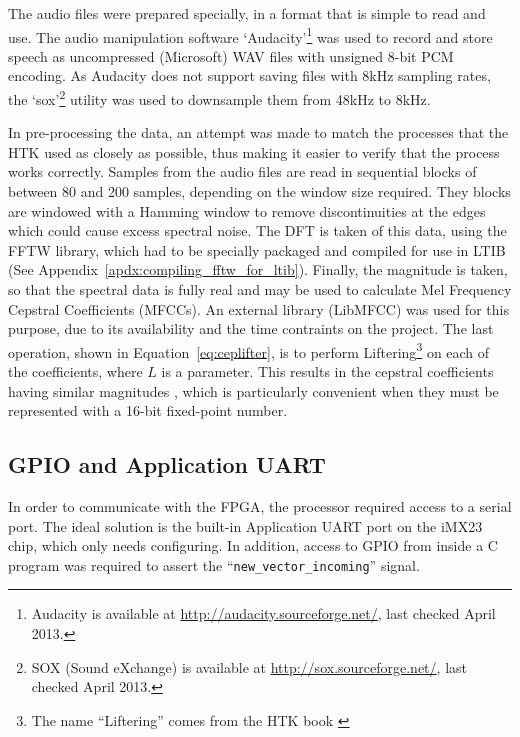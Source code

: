 		The audio files were prepared specially, in a format that is simple to read and use.  The audio manipulation software `Audacity'\footnote{Audacity is available at \href{http://audacity.sourceforge.net/}{http://audacity.sourceforge.net/}, last checked April 2013.} was used to record and store speech as uncompressed (Microsoft) WAV files with unsigned 8-bit PCM encoding.  As Audacity does not support saving files with 8kHz sampling rates, the `sox'\footnote{SOX (Sound eXchange) is available at \href{http://sox.sourceforge.net/}{http://sox.sourceforge.net/}, last checked April 2013.} utility was used to downsample them from 48kHz to 8kHz.

		In pre-processing the data, an attempt was made to match the processes that the HTK used as closely as possible, thus making it easier to verify that the process works correctly.  Samples from the audio files are read in sequential blocks of between 80 and 200 samples, depending on the window size required.  They blocks are windowed with a Hamming window to remove discontinuities at the edges which could cause excess spectral noise.  The DFT is taken of this data, using the FFTW library, which had to be specially packaged and compiled for use in LTIB (See Appendix~\ref{apdx:compiling_fftw_for_ltib}).  Finally, the magnitude is taken, so that the spectral data is fully real and may be used to calculate Mel Frequency Cepstral Coefficients (MFCCs).  An external library (LibMFCC) was used for this purpose, due to its availability and the time contraints on the project.  The last operation, shown in Equation~\ref{eq:ceplifter}, is to perform Liftering\footnote{The name ``Liftering'' comes from the HTK book \cite{htkbook}} on each of the coefficients, where $L$ is a parameter.  This results in the cepstral coefficients having similar magnitudes \cite{htkbook}, which is particularly convenient when they must be represented with a 16-bit fixed-point number.

	\subsection{GPIO and Application UART} %
	\label{sub:gpio_application_uart}
		In order to communicate with the FPGA, the processor required access to a serial port.  The ideal solution is the built-in Application UART port on the iMX23 chip, which only needs configuring.  In addition, access to GPIO from inside a C program was required to assert the ``\texttt{new\_vector\_incoming}'' signal.

